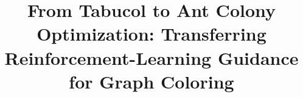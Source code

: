 
\title{From Tabucol to Ant Colony Optimization:
Transferring Reinforcement-Learning Guidance for Graph Coloring}

